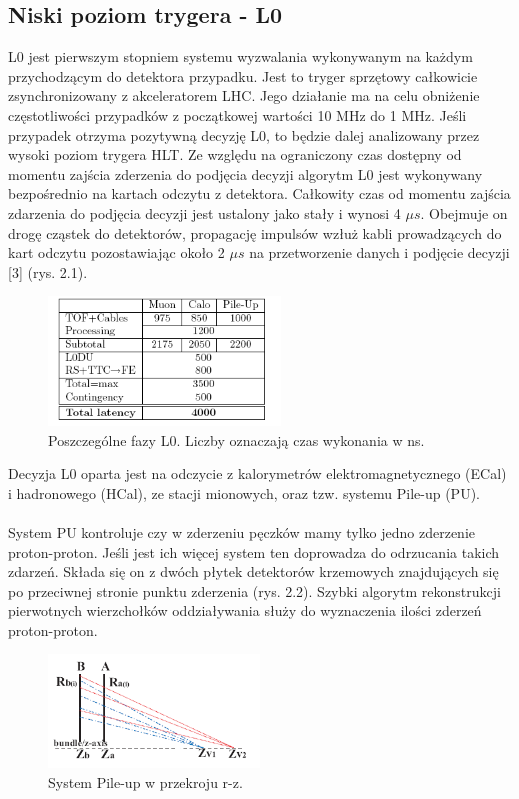 \documentclass{pracamgr}
\begin{document}
\subsection{Niski poziom trygera - L0}
L0 jest pierwszym stopniem systemu wyzwalania wykonywanym na każdym przychodzącym do detektora przypadku. Jest to tryger sprzętowy całkowicie zsynchronizowany z akceleratorem LHC. Jego działanie ma na celu obniżenie częstotliwości przypadków z początkowej wartości 10 MHz do 1 MHz. Jeśli przypadek otrzyma pozytywną decyzję L0, to będzie dalej analizowany przez wysoki poziom trygera HLT. Ze względu na ograniczony czas dostępny od momentu zajścia zderzenia do podjęcia decyzji algorytm L0 jest wykonywany bezpośrednio na kartach odczytu z detektora. Całkowity czas od momentu zajścia zdarzenia do podjęcia decyzji jest ustalony jako stały i wynosi 4 $\mu s$.  Obejmuje on drogę cząstek do detektorów, propagację impulsów wzłuż kabli prowadzących do kart odczytu pozostawiając około 2 $\mu s$ na przetworzenie danych i podjęcie decyzji [3] (rys. 2.1).
\begin{figure}[!h]
 \centering
 \includegraphics[width=0.55\textwidth]{rysunki/introduction/l0.png}
 \caption{Poszczególne fazy L0. Liczby oznaczają czas wykonania w ns.}
\end{figure}

\noindent
Decyzja L0 oparta jest na odczycie z kalorymetrów elektromagnetycznego (ECal) i hadronowego (HCal), ze stacji mionowych, oraz tzw. systemu Pile-up (PU).
\\\\
System PU kontroluje czy w zderzeniu pęczków mamy tylko jedno zderzenie proton-proton. Jeśli jest ich więcej system ten doprowadza do odrzucania takich zdarzeń. Składa się on z dwóch płytek detektorów krzemowych znajdujących się po przeciwnej stronie punktu zderzenia (rys. 2.2). Szybki algorytm rekonstrukcji pierwotnych wierzchołków oddziaływania służy do wyznaczenia ilości zderzeń proton-proton.
\\
\begin{figure}[!h]
 \centering
 \includegraphics[width=0.5\textwidth]{rysunki/introduction/pileup.png}
 \caption{System Pile-up w przekroju r-z.}
\end{figure}
\end{document}
